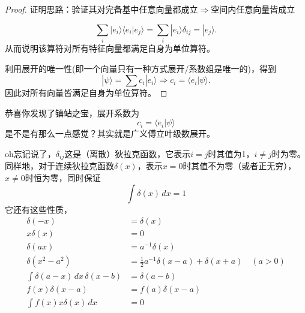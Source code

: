 \documentclass[12pt,a4paper,openany,twoside]{book}
\numberwithin{equation}{section}
\newcommand{\ket}[1]{| #1 \rangle}
\newcommand{\bracket}[2]{\langle #1 | #2 \rangle}
\begin{document}
    \begin{proof}
    	证明思路：验证其对完备基中任意向量都成立$\Rightarrow$空间内任意向量皆成立

\begin{equation}
	\sum_i \ket{e_i}\bracket{e_i}{e_j} = \sum_i\ket{e_i} \delta_{ij} = \ket{e_j}.
\end{equation}
从而说明该算符对所有特征向量都满足自身为单位算符。

利用展开的唯一性(即一个向量只有一种方式展开/系数组是唯一的)，得到
\begin{equation}
\ket{\psi} = \sum c_i \ket{e_i} \Rightarrow c_i = \bracket{e_i}{\psi}.
\end{equation}
因此对所有向量皆满足自身为单位算符。
    \end{proof}
    恭喜你发现了\sout{镇站之宝}，展开系数为
    \begin{equation}
    	c_i = \langle e_i | \psi \rangle 
    \end{equation}
    是不是有那么一点感觉？其实就是广义傅立叶级数展开。

    oh忘记说了，$\delta_{ij}$这是（离散）狄拉克函数，它表示$i=j$时其值为1，$i\neq j$时为零。同样地，对于连续狄拉克函数$\delta(x)$，表示$x=0$时其值不为零（或者正无穷），$x\neq 0$时恒为零，同时保证
    \begin{equation}
	    \int \delta(x) \, dx = 1 
    \end{equation}
    它还有这些性质，
    \begin{align}
\delta(-x) & = \delta(x) \\
x\delta(x) & = 0 \\
\delta(a x) & = a^{-1} \delta(x)\\
\delta(x^2-a^2) & = \frac{1}{2} a^{-1} {\delta(x-a)+\delta(x+a)} \quad (a>0)\\
\int \delta(a-x) \, dx \, \delta(x-b) & = \delta(a-b) \\
f(x) \delta(x-a) &=  f(a)\delta(x-a)\\
\int f(x)x\delta(x) \, dx & = 0
\end{align}
\end{document}
